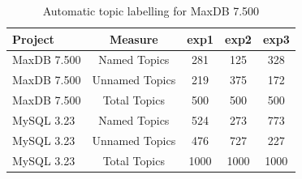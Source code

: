 \documentclass[]{sig-alternate}
\begin{document}
\begin{table}

	\centering
\begin{tabular}{l|c|c|c|c}
\toprule
Project & Measure & \textsf{exp1} & \textsf{exp2} & \textsf{exp3} \\
\midrule



MaxDB 7.500 & Named Topics   & 281 & 125 & 328 \\ %
MaxDB 7.500 & Unnamed Topics & 219  & 375 &  172  \\
MaxDB 7.500 & Total  Topics  & 500 & 500 & 500 \\
MySQL 3.23  & Named Topics   & 524 & 273 & 773 \\
MySQL 3.23  & Unnamed Topics & 476 & 727 & 227 \\
MySQL 3.23  & Total  Topics  & 1000 & 1000 & 1000 \\


\bottomrule
\end{tabular}
	\caption{Automatic topic labelling for MaxDB 7.500}
	\label{tbl:wordlist}

\end{table}
\end{document}
